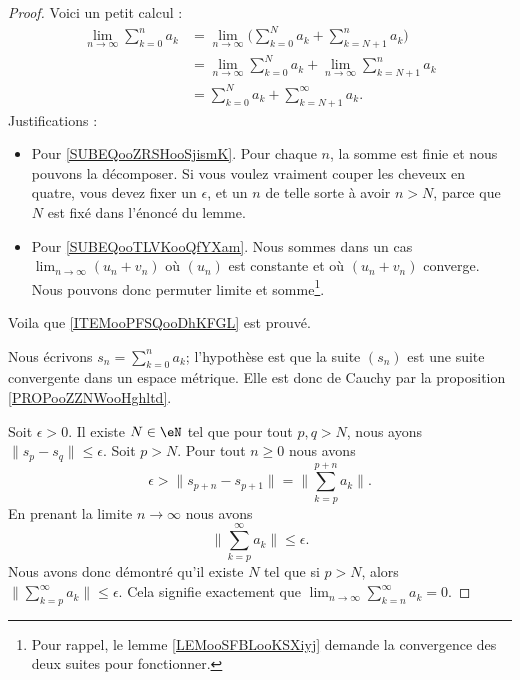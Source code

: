 \begin{proof}
    Voici un petit calcul :
    \begin{subequations}
        \begin{align}
            \lim_{n\to \infty} \sum_{k=0}^na_k&=\lim_{n\to \infty} \big( \sum_{k=0}^Na_k+\sum_{k=N+1}^{n}a_k \big)      \label{SUBEQooZRSHooSjismK}\\
            &=\lim_{n\to \infty} \sum_{k=0}^{N}a_k+\lim_{n\to \infty} \sum_{k=N+1}^{n}a_k       \label{SUBEQooTLVKooQfYXam}\\
            &=\sum_{k=0}^Na_k+\sum_{k=N+1}^{\infty}a_k.
        \end{align}
    \end{subequations}
    Justifications :
    \begin{itemize}
        \item Pour \eqref{SUBEQooZRSHooSjismK}. Pour chaque \( n\), la somme est finie et nous pouvons la décomposer. Si vous voulez vraiment couper les cheveux en quatre, vous devez fixer un \( \epsilon\), et un \( n\) de telle sorte à avoir \( n>N\), parce que \( N\) est fixé dans l'énoncé du lemme.
        \item Pour \eqref{SUBEQooTLVKooQfYXam}. Nous sommes dans un cas \( \lim_{n\to \infty}(u_n+v_n) \) où \( (u_n)\) est constante et où \( (u_n+v_n)\) converge. Nous pouvons donc permuter limite et somme\footnote{Pour rappel, le lemme \ref{LEMooSFBLooKSXiyj} demande la convergence des deux suites pour fonctionner.}.
    \end{itemize}
    Voila que \ref{ITEMooPFSQooDhKFGL} est prouvé.

    Nous écrivons \( s_n=\sum_{k=0}^na_k\); l'hypothèse est que la suite \( (s_n)\) est une suite convergente dans un espace métrique. Elle est donc de Cauchy par la proposition \ref{PROPooZZNWooHghltd}.

    Soit \( \epsilon>0\). Il existe \( N\in \eN\) tel que pour tout \( p,q>N\), nous ayons \( \| s_p-s_q \|\leq \epsilon\). Soit \( p>N\). Pour tout \( n\geq 0\) nous avons
    \begin{equation}
        \epsilon>\| s_{p+n}-s_{p+1} \|=\| \sum_{k=p}^{p+n}a_k \|.
    \end{equation}
    En prenant la limite \( n\to \infty\) nous avons
    \begin{equation}
        \| \sum_{k=p}^{\infty}a_k \|\leq \epsilon.
    \end{equation}
    Nous avons donc démontré qu'il existe \( N\) tel que si \( p>N\), alors \( \| \sum_{k=p}^{\infty}a_k \|\leq \epsilon\). Cela signifie exactement que \( \lim_{n\to \infty} \sum_{k=n}^{\infty}a_k=0\).
\end{proof}

